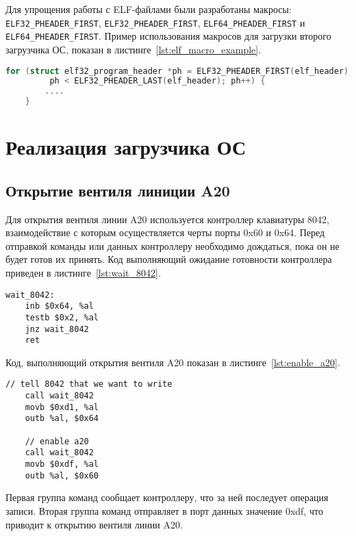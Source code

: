 Для упрощения работы с ELF-файлами были разработаны макросы: \texttt{ELF32\_PHEADER\_FIRST},
\texttt{ELF32\_PHEADER\_FIRST}, \texttt{ELF64\_PHEADER\_FIRST} и \texttt{ELF64\_PHEADER\_FIRST}.
Пример использования макросов для загрузки второго загрузчика ОС, показан в листинге~\ref{lst:elf_macro_example}.

\begin{lstlisting}[language=C,
caption={Пример использования макросов для работы с ELF-файлами},
label={lst:elf_macro_example}]
	for (struct elf32_program_header *ph = ELF32_PHEADER_FIRST(elf_header);
	     ph < ELF32_PHEADER_LAST(elf_header); ph++) {
		....
	}
\end{lstlisting}

\section{Реализация загрузчика ОС}
\subsection{Открытие вентиля линиции A20}
Для открытия вентиля линии A20 используется контроллер клавиатуры 8042, взаимодействие с которым
осуществляется черты порты 0x60 и 0x64. Перед отправкой команды или данных контроллеру необходимо дождаться, пока
он не будет готов их принять. Код выполняющий ожидание готовности контроллера приведен в листинге~\ref{lst:wait_8042}.

\begin{lstlisting}[language={[x86masm]Assembler},
caption={Ожидание готовности контроллера 8042},label={lst:wait_8042}]
wait_8042:
	inb $0x64, %al
	testb $0x2, %al
	jnz wait_8042
	ret
\end{lstlisting}

Код, выполняющий открытия вентиля A20 показан в листинге~\ref{lst:enable_a20}.

\begin{lstlisting}[language={[x86masm]Assembler},
caption={Открытие вентиля линии A20},label={lst:enable_a20}]
	// tell 8042 that we want to write
	call wait_8042
	movb $0xd1, %al
	outb %al, $0x64

	// enable a20
	call wait_8042
	movb $0xdf, %al
	outb %al, $0x60
\end{lstlisting}

Первая группа команд сообщает контроллеру, что за ней последует операция записи.
Вторая группа команд отправляет в порт данных значение 0xdf, что приводит к открытию
вентиля линии A20.

